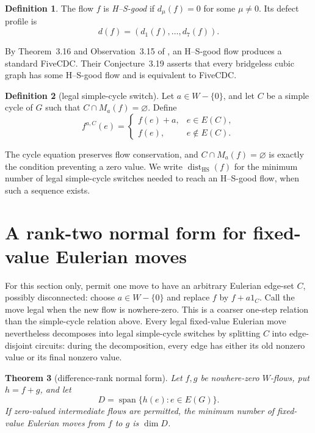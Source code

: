 \documentclass[11pt]{article}
\newtheorem{theorem}{Theorem}[section]
\theoremstyle{definition}
\newtheorem{definition}[theorem]{Definition}
\theoremstyle{remark}
\newcommand{\dist}{\operatorname{dist}}
\newcommand{\HS}{\mathrm{HS}}
\numberwithin{equation}{section}
\begin{document}
\begin{definition}
The flow \(f\) is \emph{H--S-good} if \(d_\mu(f)=0\) for some
\(\mu\ne0\).  Its defect profile is
\[
                       d(f)=(d_1(f),\ldots,d_7(f)).
\]
\end{definition}

By Theorem~3.16 and Observation~3.15 of
\cite{HusekSamal2026}, an H--S-good flow produces a standard FiveCDC.
Their Conjecture~3.19 asserts that every bridgeless cubic graph has some
H--S-good flow and is equivalent to FiveCDC.

\begin{definition}[legal simple-cycle switch]
Let \(a\in W-\{0\}\), and let \(C\) be a simple cycle of \(G\) such that
\(C\cap M_a(f)=\varnothing\).  Define
\begin{equation}
 f^{a,C}(e)=
 \begin{cases}
 f(e)+a,&e\in E(C),\\
 f(e),&e\notin E(C).
 \end{cases}
\end{equation}
\end{definition}

The cycle equation preserves flow conservation, and
\(C\cap M_a(f)=\varnothing\) is exactly the condition preventing a zero
value.  We write \(\dist_{\HS}(f)\) for the minimum number of legal
simple-cycle switches needed to reach an H--S-good flow, when such a
sequence exists.

\section{A rank-two normal form for fixed-value Eulerian moves}
\label{sec:rank-two}

For this section only, permit one move to have an arbitrary Eulerian
edge-set \(C\), possibly disconnected: choose \(a\in W-\{0\}\) and
replace \(f\) by \(f+a1_C\).  Call the move legal when the new flow is
nowhere-zero.  This is a coarser one-step relation than the
simple-cycle relation above.  Every legal fixed-value Eulerian move
nevertheless decomposes into legal simple-cycle switches by splitting
\(C\) into edge-disjoint circuits: during the decomposition, every edge
has either its old nonzero value or its final nonzero value.

\begin{theorem}[difference-rank normal form]\label{thm:rank-normal}
Let \(f,g\) be nowhere-zero \(W\)-flows, put \(h=f+g\), and let
\[
 D=\operatorname{span}\{h(e):e\in E(G)\}.
\]
If zero-valued intermediate flows are permitted, the minimum number of
fixed-value Eulerian moves from \(f\) to \(g\) is \(\dim D\).
\end{theorem}
\end{document}
